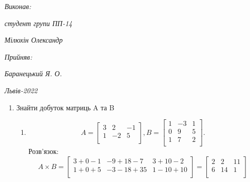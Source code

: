 \documentclass{article}
\begin{document}
\vspace{12.1pt} %
	{\fontsize{14}{22.4}\selectfont
\begin{flushright}
	\textit{Виконав:}

	\textit{студент групи ПП-14}

	\textit{Мілюхін Олександр}

	\textit{Прийняв:}

	\textit{Баранецький Я. О.}
\end{flushright}
\vspace{37.4pt} %
\begin{center}
\textit{Львів-2022}
\vspace{37.4pt} %
\end{center}
	}
{\fontsize{14}{16.1}\selectfont
\begin{enumerate}
\item Знайти добуток матриць A та B
\begin{enumerate}
\item
\begin{equation}
	A=\begin{bmatrix}
		3&2&-1\\
		1&-2&5\\
	\end{bmatrix},
	B=\begin{bmatrix}
		1&-3&1\\
		0&9&5\\
		1&7&2\\
	\end{bmatrix}.
\end{equation}
Розв'язок:
\begin{equation}
	A \times B=\begin{bmatrix}
		3+0-1&-9+18-7&3+10-2\\
		1+0+5&-3-18+35&1-10+10\\
	\end{bmatrix}=
	\begin{bmatrix}
		2&2&11\\
		6&14&1\\
	\end{bmatrix}
\end{equation}


\end{enumerate}
\end{enumerate}}
\end{document}

